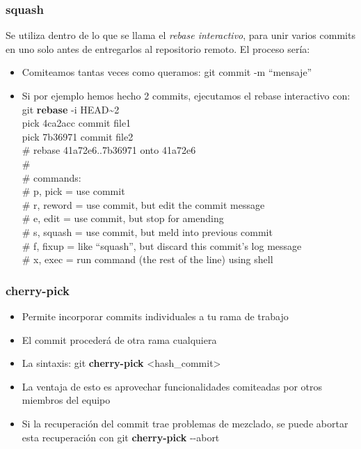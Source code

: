 \frame
{
\frametitle{squash}
 Se utiliza dentro de lo que se llama el \textit{rebase interactivo}, para unir varios commits en uno solo antes de entregarlos al repositorio remoto. El proceso sería:
 \begin{itemize}
  \item Comiteamos tantas veces como queramos: git commit -m ``mensaje''
  \item Si por ejemplo hemos hecho 2 commits, ejecutamos el rebase interactivo con: git \textbf{rebase} -i HEAD\textasciitilde2\\ \vspace{0.2cm}
  \footnotesize
   pick 4ca2acc commit file1\\
   pick 7b36971 commit file2\\
   
   \# rebase 41a72e6..7b36971 onto 41a72e6\\
   \#\\
   \# commands:\\
   \#  p, pick = use commit\\
   \#  r, reword = use commit, but edit the commit message\\
   \#  e, edit = use commit, but stop for amending\\
   \#  s, squash = use commit, but meld into previous commit\\
   \#  f, fixup = like ``squash'', but discard this commit's log message\\
   \#  x, exec = run command (the rest of the line) using shell
\end{itemize}
}

\frame
{
\frametitle{cherry-pick}
 \begin{itemize}
  \item Permite incorporar commits individuales a tu rama de trabajo
  \item El commit procederá de otra rama cualquiera
  \item La sintaxis: git \textbf{cherry-pick} <hash\_commit>
  \item La ventaja de esto es aprovechar funcionalidades comiteadas por otros miembros del equipo
  \item Si la recuperación del commit trae problemas de mezclado, se puede abortar esta recuperación con git \textbf{cherry-pick} -{}-abort
 \end{itemize}
}


